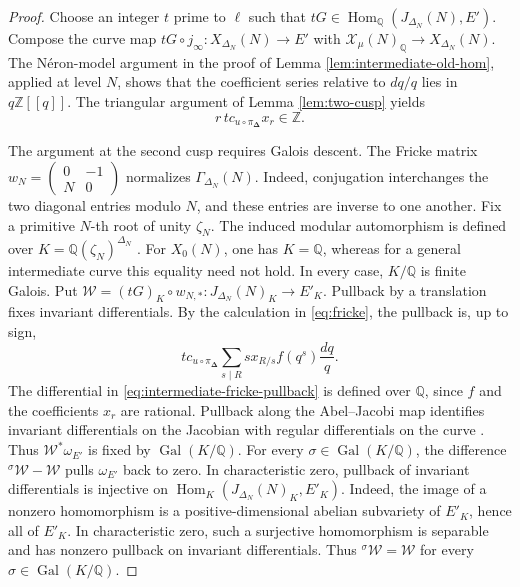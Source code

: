 \documentclass[12pt, letterpaper]{amsart}
\theoremstyle{definition}
\theoremstyle{remark}
\newcommand{\Q}{\mathbb Q}
\newcommand{\Z}{\mathbb Z}
\newcommand{\Hom}{\operatorname{Hom}}
\numberwithin{equation}{section}
\begin{document}
\begin{proof}
Choose an integer \(t\) prime to \(\ell\) such that
\(tG\in\Hom_\Q(J_{\Delta_N}(N),E')\). Compose the curve map
\(tG\circ j_\infty:X_{\Delta_N}(N)\to E'\) with
\(\mathcal X_\mu(N)_\Q\to X_{\Delta_N}(N)\). The N\'eron-model argument in the
proof of Lemma \ref{lem:intermediate-old-hom}, applied at level \(N\), shows
that the coefficient series relative to \(dq/q\) lies in \(q\Z[[q]]\). The
triangular argument of Lemma \ref{lem:two-cusp} yields
\begin{equation}\label{eq:intermediate-first-triangular}
        r\,t c_{u\circ\pi_{\boldsymbol\Delta}}x_r\in\Z.
\end{equation}

The argument at the second cusp requires Galois descent. The Fricke matrix
\(w_N=\left(\begin{smallmatrix}0&-1\\N&0\end{smallmatrix}\right)\) normalizes
\(\Gamma_{\Delta_N}(N)\). Indeed, conjugation interchanges the two
diagonal entries modulo \(N\), and these entries are inverse to one another.
Fix a primitive \(N\)-th root of unity \(\zeta_N\).
The induced modular automorphism is defined over
\(K=\Q(\zeta_N)^{\Delta_N}\)
\cite[Lemma~1.8]{JeonKimSchweizer}. For \(X_0(N)\), one has \(K=\Q\), whereas
for a general intermediate curve this equality need not hold. In every case,
\(K/\Q\) is finite Galois.
Put
\(\mathcal W=(tG)_K\circ w_{N,*}:J_{\Delta_N}(N)_K\to E'_K\).
Pullback by a translation fixes invariant differentials.
By the calculation in \eqref{eq:fricke}, the pullback is, up to sign,
\begin{equation}\label{eq:intermediate-fricke-pullback}
        t c_{u\circ\pi_{\boldsymbol\Delta}}
        \sum_{s\mid R}s x_{R/s}f(q^s)\frac{dq}{q}.
\end{equation}
The differential in \eqref{eq:intermediate-fricke-pullback} is defined over
\(\Q\), since \(f\) and the coefficients \(x_r\) are rational.
Pullback along the Abel--Jacobi map identifies invariant
differentials on the Jacobian with regular differentials on the curve
\cite{MilneJacobians}. Thus
\(\mathcal W^*\omega_{E'}\) is fixed by \(\operatorname{Gal}(K/\Q)\). For
every \(\sigma\in\operatorname{Gal}(K/\Q)\), the difference
\({}^{\sigma}\!\mathcal W-\mathcal W\) pulls \(\omega_{E'}\) back to zero.
In characteristic zero, pullback of invariant differentials is injective on
\(\Hom_K(J_{\Delta_N}(N)_K,E'_K)\). Indeed, the image of a nonzero
homomorphism is a positive-dimensional abelian subvariety of \(E'_K\), hence
all of \(E'_K\). In characteristic zero, such a surjective homomorphism is
separable and has nonzero pullback on invariant differentials. Thus
\({}^{\sigma}\!\mathcal W=\mathcal W\) for every
\(\sigma\in\operatorname{Gal}(K/\Q)\).


\end{proof}
\end{document}
